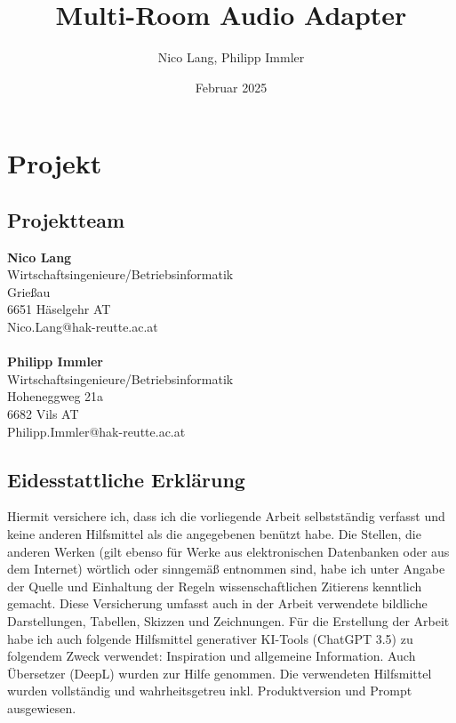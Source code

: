 \documentclass[11pt, twoside]{article}
\title{\textbf{Multi-Room Audio Adapter}}
\author{Nico Lang, Philipp Immler}
\date{Februar 2025}
\begin{document}




\section{Projekt}
\vspace{-100mm}
\subsection{Projektteam}
\textbf{Nico Lang}\\
Wirtschaftsingenieure/Betriebsinformatik\\
Grießau\\
6651 Häselgehr AT\\
Nico.Lang@hak-reutte.ac.at\\
\\
\textbf{Philipp Immler}\\
Wirtschaftsingenieure/Betriebsinformatik\\
Hoheneggweg 21a\\
6682 Vils AT\\
Philipp.Immler@hak-reutte.ac.at

\pagebreak

\subsection{Eidesstattliche Erklärung}
Hiermit versichere ich, dass ich die vorliegende Arbeit selbstständig verfasst und keine anderen Hilfsmittel als die angegebenen benützt habe. Die Stellen, die anderen Werken (gilt ebenso für Werke aus elektronischen Datenbanken oder aus dem Internet) wörtlich oder sinngemäß entnommen sind, habe ich unter Angabe der Quelle und Einhaltung der Regeln wissenschaftlichen Zitierens kenntlich gemacht. Diese Versicherung umfasst auch in der Arbeit verwendete bildliche Darstellungen, Tabellen, Skizzen und Zeichnungen. Für die Erstellung der Arbeit habe ich auch folgende Hilfsmittel generativer KI-Tools (ChatGPT 3.5) zu folgendem Zweck verwendet: Inspiration und allgemeine Information. Auch Übersetzer (DeepL) wurden zur Hilfe genommen. Die verwendeten Hilfsmittel wurden vollständig und wahrheitsgetreu inkl. Produktversion und Prompt ausgewiesen.\\
\end{document}
